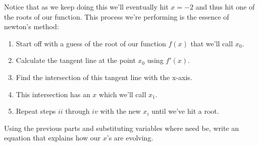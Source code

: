 \begin{enumerate}
    \qitem 
    Notice that as we keep doing this we'll eventually hit $x = -2$ and thus hit one of the roots of our function. 
    This process we're performing is the essence of newton's method:
    \begin{enumerate}
        \item Start off with a guess of the root of our function $f(x)$ that we'll call $x_0$.
        \item Calculate the tangent line at the point $x_0$ using $f'(x)$.
        \item Find the intersection of this tangent line with the x-axis.
        \item This intersection has an $x$ which we'll call $x_1$. 
        \item Repeat steps $ii$ through $iv$ with the new $x_i$ until we've hit a root.
    \end{enumerate}
    Using the previous parts and substituting variables where need be, write an equation that explains how our $x$'s are evolving.



\end{enumerate}
